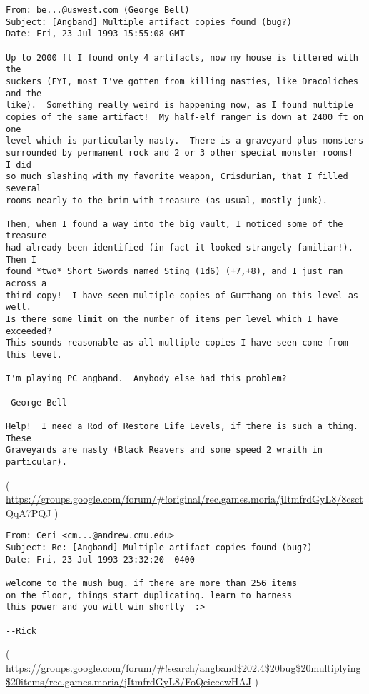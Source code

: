 \begin{lstlisting}
From: be...@uswest.com (George Bell)
Subject: [Angband] Multiple artifact copies found (bug?)
Date: Fri, 23 Jul 1993 15:55:08 GMT

Up to 2000 ft I found only 4 artifacts, now my house is littered with the
suckers (FYI, most I've gotten from killing nasties, like Dracoliches and the
like).  Something really weird is happening now, as I found multiple
copies of the same artifact!  My half-elf ranger is down at 2400 ft on one
level which is particularly nasty.  There is a graveyard plus monsters
surrounded by permanent rock and 2 or 3 other special monster rooms!  I did
so much slashing with my favorite weapon, Crisdurian, that I filled several
rooms nearly to the brim with treasure (as usual, mostly junk).

Then, when I found a way into the big vault, I noticed some of the treasure
had already been identified (in fact it looked strangely familiar!).  Then I
found *two* Short Swords named Sting (1d6) (+7,+8), and I just ran across a
third copy!  I have seen multiple copies of Gurthang on this level as well.
Is there some limit on the number of items per level which I have exceeded?
This sounds reasonable as all multiple copies I have seen come from this level.

I'm playing PC angband.  Anybody else had this problem?

-George Bell

Help!  I need a Rod of Restore Life Levels, if there is such a thing.  These
Graveyards are nasty (Black Reavers and some speed 2 wraith in particular). 
\end{lstlisting}
( \url{https://groups.google.com/forum/#!original/rec.games.moria/jItmfrdGyL8/8csctQqA7PQJ} )

\begin{lstlisting}
From: Ceri <cm...@andrew.cmu.edu>
Subject: Re: [Angband] Multiple artifact copies found (bug?)
Date: Fri, 23 Jul 1993 23:32:20 -0400

welcome to the mush bug. if there are more than 256 items
on the floor, things start duplicating. learn to harness
this power and you will win shortly  :>

--Rick
\end{lstlisting}
( \url{https://groups.google.com/forum/#!search/angband$202.4$20bug$20multiplying$20items/rec.games.moria/jItmfrdGyL8/FoQeiccewHAJ} )

